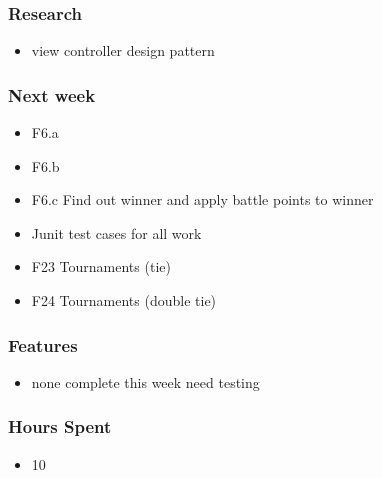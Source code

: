 \documentclass[10pt,a4paper]{article}
\begin{document}
\subsubsection*{Research}
\begin{itemize}
\item view controller design pattern
\end{itemize}
\subsubsection*{Next week}
\begin{itemize}
\item F6.a
\item F6.b
\item F6.c Find out winner and apply battle points to winner
\item Junit test cases for all work
\item F23 Tournaments (tie)
\item F24 Tournaments (double tie)
\end{itemize}
\subsubsection*{Features}
\begin{itemize}
\item none complete this week need testing
\end{itemize}
\subsubsection*{Hours Spent}
\begin{itemize}
\item 10
\end{itemize}
\end{document}
